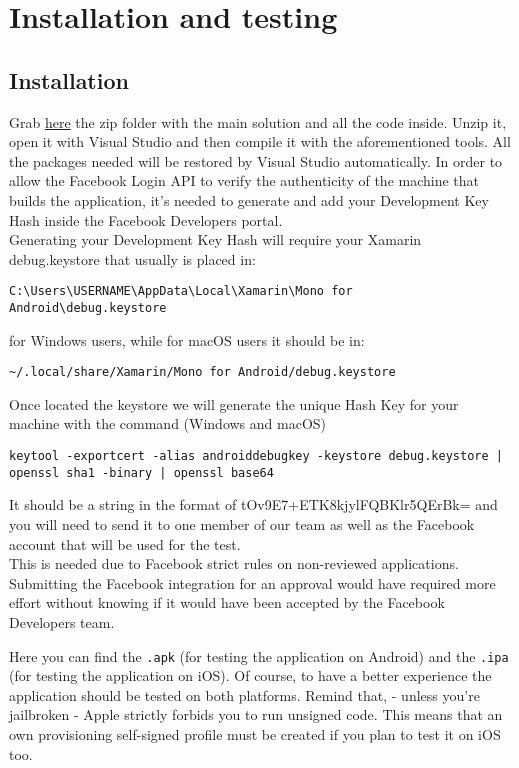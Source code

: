 \chapter{Installation and testing}
\label{cha:testing}

\section{Installation}
Grab \href{https://www.dropbox.com/s/k4f3rba3lldi6g0/Travlendar.zip?dl=0}{here} the zip folder with the main solution and all the code inside. Unzip it, open it with Visual Studio and then compile it with the aforementioned tools. All the packages needed will be restored by Visual Studio automatically. 
In order to allow the Facebook Login API to verify the authenticity of the machine that builds the application, it's needed to generate and add your Development Key Hash inside the Facebook Developers portal.\\
Generating your Development Key Hash will require your Xamarin debug.keystore that usually is placed in: \begin{verbatim}C:\Users\USERNAME\AppData\Local\Xamarin\Mono for Android\debug.keystore \end{verbatim}
for Windows users, while for macOS users it should be in: \begin{verbatim}~/.local/share/Xamarin/Mono for Android/debug.keystore\end{verbatim}
Once located the keystore we will generate the unique Hash Key for your machine with the command (Windows and macOS)
\begin{verbatim}
keytool -exportcert -alias androiddebugkey -keystore debug.keystore | 
openssl sha1 -binary | openssl base64 
 \end{verbatim}
It should be a string in the format of tOv9E7+ETK8kjylFQBKlr5QErBk= and you will need to send it to one member of our team as well as the Facebook account that will be used for the test. \\
This is needed due to Facebook strict rules on non-reviewed applications. Submitting the Facebook integration for an approval would have required more effort without knowing if it would have been accepted by the Facebook Developers team.


Here you can find the \verb|.apk| (for testing the application on Android) and the \verb|.ipa| (for testing the application on iOS). Of course, to have a better experience the application should be tested on both platforms. Remind that, - unless you're jailbroken - Apple strictly forbids you to run unsigned code. This means that an own provisioning self-signed profile must be created if you plan to test it on iOS too.

